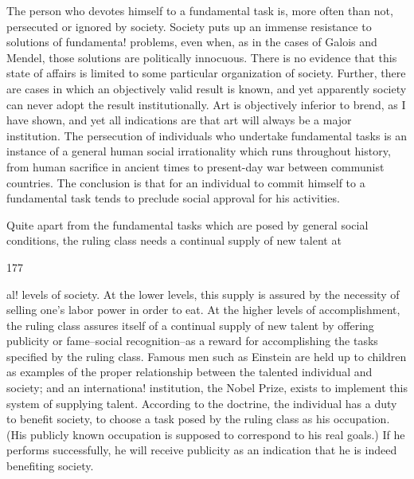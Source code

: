 \documentclass[10pt,twoside]{memoir}
\begin{document}
\begin{enumerate}
{\begin{enumerate}
\begin{sysrules}
\begin{sysrules}
\begin{sysrules}
\begin{sysrules}
{\begin{enumerate}
{{{{{{{The person who devotes himself to a fundamental task is, more often 
than not, persecuted or ignored by society. Society puts up an immense 
resistance to solutions of fundamenta! problems, even when, as in the cases 
of Galois and Mendel, those solutions are politically innocuous. There is no 
evidence that this state of affairs is limited to some particular organization of 
society. Further, there are cases in which an objectively valid result is 
known, and yet apparently society can never adopt the result institutionally. 
Art is objectively inferior to brend, as I have shown, and yet all indications 
are that art will always be a major institution. The persecution of individuals 
who undertake fundamental tasks is an instance of a general human social 
irrationality which runs throughout history, from human sacrifice in ancient 
times to present-day war between communist countries. The conclusion is 
that for an individual to commit himself to a fundamental task tends to 
preclude social approval for his activities. 

Quite apart from the fundamental tasks which are posed by general 
social conditions, the ruling class needs a continual supply of new talent at 


177 


al! levels of society. At the lower levels, this supply is assured by the 
necessity of selling one's labor power in order to eat. At the higher levels of 
accomplishment, the ruling class assures itself of a continual supply of new 
talent by offering publicity or fame--social recognition--as a reward for 
accomplishing the tasks specified by the ruling class. Famous men such as 
Einstein are held up to children as examples of the proper relationship 
between the talented individual and society; and an internationa! institution, 
the Nobel Prize, exists to implement this system of supplying talent. 
According to the doctrine, the individual has a duty to benefit society, to 
choose a task posed by the ruling class as his occupation. (His publicly 
known occupation is supposed to correspond to his real goals.) If he 
performs successfully, he will receive publicity as an indication that he is 
indeed benefiting society. 

}}}}}}}
\end{enumerate}}
\end{sysrules}
\end{sysrules}
\end{sysrules}
\end{sysrules}
\end{enumerate}}
\end{enumerate}
\end{document}
